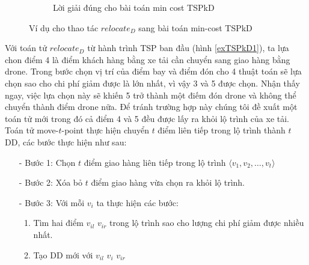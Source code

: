 \documentclass[a4paper,12pt]{report}
\begin{document}
\begin{figure}[H]
\begin{subfigure}{1\textwidth}
\label{exTSPkD3}
\caption{Lời giải đúng cho bài toán min cost \ac{TSPkD}}
\end{subfigure}
\caption{Ví dụ cho thao tác $relocate_D$ sang bài toán min-cost \ac{TSPkD}}\label{exTSPkD}
\end{figure}

Với toán tử $relocate_D$ từ hành trình \ac{TSP} ban đầu (hình \ref{exTSPkD1}), ta lựa chon điểm 4 là điểm khách hàng bằng xe tải cần chuyển sang giao hàng bằng drone. Trong bước chọn vị trí của điểm bay và điểm đón cho 4 thuật toán sẽ lựa chọn sao cho chi phí giảm được là lớn nhất, vì vậy 3 và 5 được chọn. Nhận thấy ngay, việc lựa chọn này sẽ khiến 5 trở thành một điếm đón drone và không thể chuyển thành điểm drone nữa. Để tránh trường hợp này chúng tôi đề xuất một toán tử mới trong đó cả điểm 4 và 5 đều được lấy ra khỏi lộ trình của xe tải. \\

Toán tử move-$t$-point thực hiện chuyển $t$ điểm liên tiếp trong lộ trình thành $t$ DD, các bước thực hiện như sau: 
\begin{itemize}
\item[-] Bước 1: Chọn $t$ điểm giao hàng liên tiếp trong lộ trình $\langle v_1,v_2,\ldots,v_t \rangle$
\item[-] Bước 2: Xóa bỏ $t$ điểm giao hàng vừa chọn ra khỏi lộ trình.
\item[-] Bước 3: Với mỗi $v_i$ ta thực hiện các bước: 
\begin{enumerate}
\item Tìm hai điểm $v_{il}$ $v_{ir}$ trong lộ trình sao cho lượng chi phí giảm được nhiều nhất.
\item Tạo \ac{DD} mới với $v_{il}$ $v_{i}$ $v_{ir}$
\end{enumerate}
\end{itemize}
\end{document}
